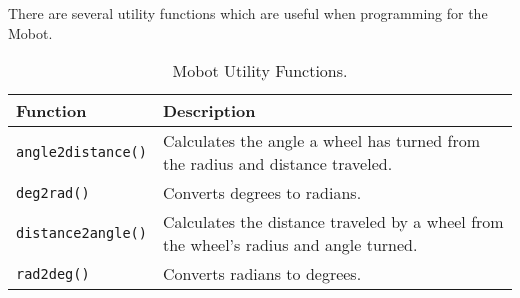 \noindent
There are several utility functions which are useful when programming for
the Mobot. 

\begin{table}[!h]
\begin{center}
\caption{Mobot Utility Functions.}
\begin{tabular}{p{38 mm}p{110 mm}}
\hline
Function & Description \\
\hline
\texttt{angle2distance()} & Calculates the angle a wheel has turned from the
radius and distance traveled.\\
\texttt{deg2rad()} & Converts degrees to radians. \\
\texttt{distance2angle()} & Calculates the distance traveled by a wheel from the wheel's radius and angle turned.\\
\texttt{rad2deg()} & Converts radians to degrees.\\
\hline
\end{tabular}
\end{center}
\label{mobilec_api_cbinary}
\end{table}

\clearpage
\newpage






